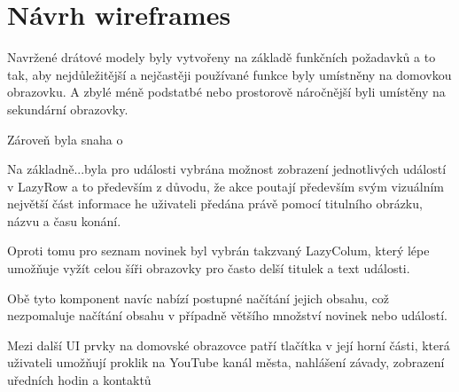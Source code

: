 \section{Návrh wireframes}
Navržené drátové modely byly vytvořeny na základě funkčních požadavků a to tak, aby nejdůležitější a nejčastěji používané funkce byly 
umístněny na domovkou obrazovku. A zbylé méně podstatbé nebo prostorově náročnější byli umístěny na sekundární obrazovky.

Zároveň byla snaha o 

Na základně...byla pro události vybrána možnost zobrazení jednotlivých událostí v LazyRow a to především z důvodu, že 
akce poutají především svým vizuálním největší část informace he uživateli předána právě pomocí titulního obrázku, názvu
a času konání.

Oproti tomu pro seznam novinek byl vybrán takzvaný LazyColum, který lépe umožňuje vyžít celou šíři obrazovky pro často delší
titulek a text události.

Obě tyto komponent navíc nabízí postupné načítání jejich obsahu, což nezpomaluje načítání obsahu v případně většího množství novinek
nebo událostí.

Mezi další UI prvky na domovské obrazovce patří tlačítka v její horní části, která uživateli umožňují proklik na YouTube kanál města,
nahlášení závady, zobrazení uředních hodin a kontaktů 

